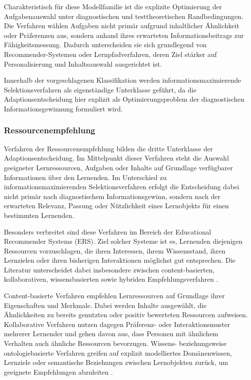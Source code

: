 Charakteristisch für diese Modellfamilie ist die explizite Optimierung
der Aufgabenauswahl unter diagnostischen und testtheoretischen
Randbedingungen. Die Verfahren wählen Aufgaben nicht primär aufgrund
inhaltlicher Ähnlichkeit oder Präferenzen aus, sondern anhand ihres
erwarteten Informationsbeitrags zur Fähigkeitsmessung. Dadurch
unterscheiden sie sich grundlegend von Recommender-Systemen oder
Lernpfadverfahren, deren Ziel stärker auf Personalisierung und
Inhaltsauswahl ausgerichtet ist.

Innerhalb der vorgeschlagenen Klassifikation werden
informationsmaximierende Selektionsverfahren als eigenständige
Unterklasse geführt, da die Adaptionsentscheidung hier explizit als
Optimierungsproblem der diagnostischen Informationsgewinnung formuliert
wird.

\subsubsection{Ressourcenempfehlung}\label{ressourcenempfehlung}

Verfahren der Ressourcenempfehlung bilden die dritte Unterklasse der
Adaptionsentscheidung. Im Mittelpunkt dieser Verfahren steht die Auswahl
geeigneter Lernressourcen, Aufgaben oder Inhalte auf Grundlage
verfügbarer Informationen über den Lernenden. Im Unterschied zu
informationsmaximierenden Selektionsverfahren erfolgt die Entscheidung
dabei nicht primär nach diagnostischem Informationsgewinn, sondern nach
der erwarteten Relevanz, Passung oder Nützlichkeit eines Lernobjekts für
einen bestimmten Lernenden.

Besonders verbreitet sind diese Verfahren im Bereich der Educational
Recommender Systems (ERS). Ziel solcher Systeme ist es, Lernenden
diejenigen Ressourcen vorzuschlagen, die ihren Interessen, ihrem
Wissensstand, ihren Lernzielen oder ihren bisherigen Interaktionen
möglichst gut entsprechen. Die Literatur unterscheidet dabei
insbesondere zwischen content-basierten, kollaborativen,
wissensbasierten sowie hybriden Empfehlungsverfahren
\citep{daSilva2023}.

Content-basierte Verfahren empfehlen Lernressourcen auf Grundlage ihrer
Eigenschaften und Merkmale. Dabei werden Inhalte ausgewählt, die
Ähnlichkeiten zu bereits genutzten oder positiv bewerteten Ressourcen
aufweisen. Kollaborative Verfahren nutzen dagegen Präferenz- oder
Interaktionsmuster mehrerer Lernender und gehen davon aus, dass Personen
mit ähnlichem Verhalten auch ähnliche Ressourcen bevorzugen. Wissens-
beziehungsweise ontologiebasierte Verfahren greifen auf explizit
modelliertes Domänenwissen, Lernziele oder semantische Beziehungen
zwischen Lernobjekten zurück, um geeignete Empfehlungen abzuleiten
\citep{daSilva2023}.

